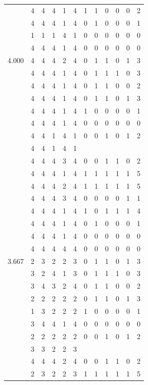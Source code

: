 \documentclass[]{book}
\theoremstyle{definition}
\theoremstyle{definition}
\theoremstyle{definition}
\theoremstyle{remark}
\begin{document}
\begin{table}
{\begin{tabular}[t]{rrrrrrrrrrrr}
 & 4 & 4 & 4 & 1 & 4 & 1 & 1 & 0 & 0 & 0 & 2\\
 & 4 & 4 & 4 & 1 & 4 & 0 & 1 & 0 & 0 & 0 & 1\\
 & 1 & 1 & 1 & 4 & 1 & 0 & 0 & 0 & 0 & 0 & 0\\
 & 4 & 4 & 4 & 1 & 4 & 0 & 0 & 0 & 0 & 0 & 0\\
4.000 & 4 & 4 & 4 & 2 & 4 & 0 & 1 & 1 & 0 & 1 & 3\\
 & 4 & 4 & 4 & 1 & 4 & 0 & 1 & 1 & 1 & 0 & 3\\
 & 4 & 4 & 4 & 1 & 4 & 0 & 1 & 1 & 0 & 0 & 2\\
 & 4 & 4 & 4 & 1 & 4 & 0 & 1 & 1 & 0 & 1 & 3\\
 & 4 & 4 & 4 & 1 & 4 & 1 & 0 & 0 & 0 & 0 & 1\\
 & 4 & 4 & 4 & 1 & 4 & 0 & 0 & 0 & 0 & 0 & 0\\
 & 4 & 4 & 1 & 4 & 1 & 0 & 0 & 1 & 0 & 1 & 2\\
 & 4 & 4 & 1 & 4 & 1 &  &  &  &  &  & \\
 & 4 & 4 & 4 & 3 & 4 & 0 & 0 & 1 & 1 & 0 & 2\\
 & 4 & 4 & 4 & 1 & 4 & 1 & 1 & 1 & 1 & 1 & 5\\
 & 4 & 4 & 4 & 2 & 4 & 1 & 1 & 1 & 1 & 1 & 5\\
 & 4 & 4 & 4 & 3 & 4 & 0 & 0 & 0 & 0 & 1 & 1\\
 & 4 & 4 & 4 & 1 & 4 & 1 & 0 & 1 & 1 & 1 & 4\\
 & 4 & 4 & 4 & 1 & 4 & 0 & 1 & 0 & 0 & 0 & 1\\
 & 4 & 4 & 4 & 1 & 4 & 0 & 0 & 0 & 0 & 0 & 0\\
 & 4 & 4 & 4 & 4 & 4 & 0 & 0 & 0 & 0 & 0 & 0\\
3.667 & 2 & 3 & 2 & 2 & 3 & 0 & 1 & 1 & 0 & 1 & 3\\
 & 3 & 2 & 4 & 1 & 3 & 0 & 1 & 1 & 1 & 0 & 3\\
 & 3 & 4 & 3 & 2 & 4 & 0 & 1 & 1 & 0 & 0 & 2\\
 & 2 & 2 & 2 & 2 & 2 & 0 & 1 & 1 & 0 & 1 & 3\\
 & 1 & 3 & 2 & 2 & 2 & 1 & 0 & 0 & 0 & 0 & 1\\
 & 3 & 4 & 4 & 1 & 4 & 0 & 0 & 0 & 0 & 0 & 0\\
 & 2 & 2 & 2 & 2 & 2 & 0 & 0 & 1 & 0 & 1 & 2\\
 & 3 & 3 & 2 & 2 & 3 &  &  &  &  &  & \\
 & 4 & 4 & 4 & 2 & 4 & 0 & 0 & 1 & 1 & 0 & 2\\
 & 2 & 3 & 2 & 2 & 3 & 1 & 1 & 1 & 1 & 1 & 5\\

\end{tabular}}
\end{table}
\end{document}
